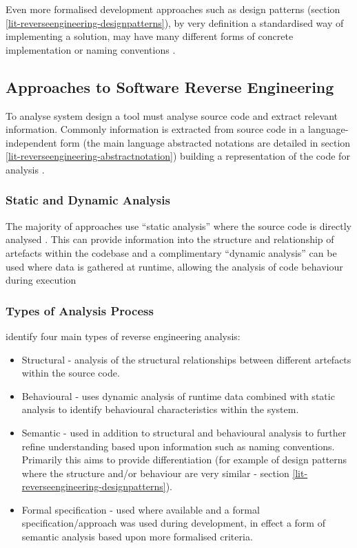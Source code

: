 Even more formalised development approaches such as design patterns (section \ref{lit-reverseengineering-designpatterns}), by very definition a standardised way of implementing a solution, may have many different forms of concrete implementation or naming conventions \citep{uchiyama2011design}.

\clearpage
\subsection{Approaches to Software Reverse Engineering}\label{lit-reverseengineering-approaches}

To analyse system design a tool must analyse source code and extract relevant information. Commonly information is extracted from source code in a language-independent form (the main language abstracted notations are detailed in section \ref{lit-reverseengineering-abstractnotation}) building a representation of the code for analysis \citep{arcelli2005comparison}.

\subsubsection{Static and Dynamic Analysis}\label{lit-reverseengineering-staticdynamic}

The majority of approaches use ``static analysis'' where the source code is directly analysed \citep{shi2006reverse,arcelli2005comparison,flores2005reverse}. This can provide information into the structure and relationship of artefacts within the codebase and a complimentary ``dynamic analysis'' can be used where data is gathered at runtime, allowing the analysis of code behaviour during execution \citep{cerulo2006use,rasoolsurvey}

\subsubsection{Types of Analysis Process}\label{lit-reverseengineering-types}

\cite{rasoolsurvey} identify four main types of reverse engineering analysis:

\begin{itemize}
\item Structural - analysis of the structural relationships between different artefacts within the source code.
\item Behavioural - uses dynamic analysis of runtime data combined with static analysis to identify behavioural characteristics within the system.
\item Semantic - used in addition to structural and behavioural analysis to further refine understanding based upon information such as naming conventions. Primarily this aims to provide differentiation (for example of design patterns where the structure and/or behaviour are very similar - section \ref{lit-reverseengineering-designpatterns}).
\item Formal specification - used where available and a formal specification/approach was used during development, in effect a form of semantic analysis based upon more formalised criteria.
\end{itemize}

